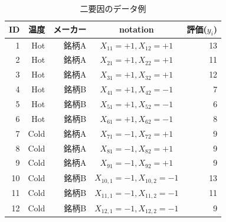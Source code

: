 \begin{table}[ht]
	\centering
	\caption{二要因のデータ例}
	\begin{tabular}{rrrcr}
		\hline
		ID & 温度   & メーカー & notation                  & 評価($y_{i}$) \\
		\hline
		1  & Hot  & 銘柄A  & $X_{11}=+1,X_{12}=+1$     & 13          \\
		2  & Hot  & 銘柄A  & $X_{21}=+1,X_{22}=+1$     & 11          \\
		3  & Hot  & 銘柄A  & $X_{31}=+1,X_{32}=+1$     & 12          \\
		4  & Hot  & 銘柄B  & $X_{41}=+1,X_{42}=-1$     & 7           \\
		5  & Hot  & 銘柄B  & $X_{51}=+1,X_{52}=-1$     & 6           \\
		6  & Hot  & 銘柄B  & $X_{61}=+1,X_{62}=-1$     & 8           \\
		7  & Cold & 銘柄A  & $X_{71}=-1,X_{72}=+1$     & 9           \\
		8  & Cold & 銘柄A  & $X_{81}=-1,X_{82}=+1$     & 9           \\
		9  & Cold & 銘柄A  & $X_{91}=-1,X_{92}=+1$     & 9           \\
		10 & Cold & 銘柄B  & $X_{10,1}=-1,X_{10,2}=-1$ & 13          \\
		11 & Cold & 銘柄B  & $X_{11,1}=-1,X_{11,2}=-1$ & 11          \\
		12 & Cold & 銘柄B  & $X_{12,1}=-1,X_{12,2}=-1$ & 9           \\
		\hline
	\end{tabular}

	\label{tbl::13_01}
\end{table}
